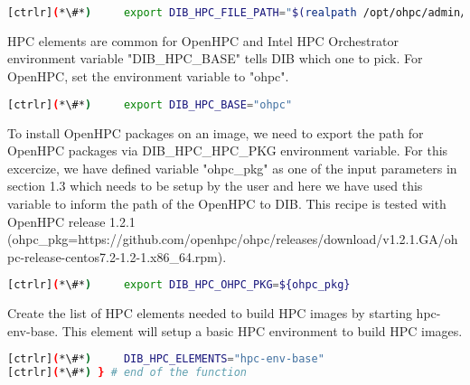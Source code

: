 \begin{lstlisting}[language=bash,keywords={}]
[ctrlr](*\#*)     export DIB_HPC_FILE_PATH="$(realpath /opt/ohpc/admin/dib-chpc/hpc-files/)"
\end{lstlisting}

	HPC elements are common for OpenHPC and Intel HPC Orchestrator environment variable \newline
	"DIB\_HPC\_BASE" tells DIB which one to pick. For OpenHPC, set the environment variable to "ohpc".

\begin{lstlisting}[language=bash,keywords={}]
[ctrlr](*\#*)     export DIB_HPC_BASE="ohpc"
\end{lstlisting}

	To install OpenHPC packages on an image, we need to export the path for OpenHPC packages via DIB\_HPC\_HPC\_PKG environment variable. For this excercize, we have defined variable "ohpc\_pkg" as one of the input parameters in section 1.3 which needs to be setup by the user and here we have used this variable to inform the path of the OpenHPC to DIB. This recipe is tested with OpenHPC release 1.2.1 (ohpc\_pkg=https://github.com/openhpc/ohpc/releases/download/v1.2.1.GA/ohpc-release-centos7.2-1.2-1.x86\_64.rpm).

\begin{lstlisting}[language=bash,keywords={}]
[ctrlr](*\#*)     export DIB_HPC_OHPC_PKG=${ohpc_pkg}
\end{lstlisting}

	Create the list of HPC elements needed to build HPC images by starting hpc-env-base. This element will setup a basic HPC environment to build HPC images.

\begin{lstlisting}[language=bash,keywords={}]
[ctrlr](*\#*)     DIB_HPC_ELEMENTS="hpc-env-base"
[ctrlr](*\#*) } # end of the function
\end{lstlisting}
